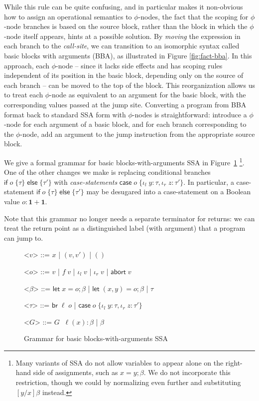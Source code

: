\documentclass[acmsmall,screen,review]{acmart}
\newcommand{\mb}[1]{\ensuremath{\mathbf{#1}}}
\newcommand{\ms}[1]{\ensuremath{\mathsf{#1}}}
\newcommand{\lto}{:}
\newcommand{\linl}[1]{\iota_l\;{#1}}
\newcommand{\linr}[1]{\iota_r\;{#1}}
\newcommand{\labort}[1]{\ms{abort}\;{#1}}
\newcommand{\letstmt}[3]{\ensuremath{\ms{let}\;#1 = #2; #3}}
\newcommand{\brb}[2]{\ms{br}\;#1\;#2}
\newcommand{\ite}[3]{\ms{if}\;#1\;\{#2\}\;\ms{else}\;\{#3\}}
\newcommand{\casestmt}[5]{\ms{case}\;#1\;\{\linl{#2} \lto #3, \linr{#4} \lto #5\}}
\begin{document}
While this rule can be quite confusing, and in particular makes it non-obvious how to assign an
operational semantics to $\phi$-nodes, the fact that the scoping for $\phi$-node branches is based
on the source block, rather than the block in which the $\phi$-node itself appears, hints at a
possible solution. By \emph{moving} the expression in each branch to the \emph{call-site}, we can
transition to an isomorphic syntax called basic blocks with arguments (BBA), as illustrated in
Figure \ref{fig:fact-bba}. In this approach, each $\phi$-node -- since it lacks side effects and has
scoping rules independent of its position in the basic block, depending only on the source of each
branch -- can be moved to the top of the block. This reorganization allows us to treat each
$\phi$-node as equivalent to an argument for the basic block, with the corresponding values passed
at the jump site. Converting a program from BBA format back to standard SSA form with $\phi$-nodes
is straightforward: introduce a $\phi$-node for each argument of a basic block, and for each branch
corresponding to the $\phi$-node, add an argument to the jump instruction from the appropriate
source block. 

We give a formal grammar for basic blocks-with-arguments SSA in Figure~\ref{fig:bba-grammar}
\footnote{ Many variants of SSA do not allow variables to appear alone on the right-hand side of
assignments, such as $x = y; \beta$.  We do not incorporate this restriction, though we could by
normalizing even further and substituting $[y/x]\beta$ instead. }. One of the other changes we make
is replacing conditional branches $\ite{o}{\tau}{\tau'}$ with \emph{case-statements}
$\casestmt{o}{y}{\tau}{z}{\tau'}$. In particular, a case-statement $\ite{o}{\tau}{\tau'}$ may be
desugared into a case-statement on a Boolean value $o : \mb{1} + \mb{1}$.

Note that this grammar no longer needs a separate terminator for returns: we can treat the return
point as a distinguished label (with argument) that a program can jump to. 

\begin{figure}[H]
  \begin{center}
    \begin{grammar}
      <\(v\)> ::= \(x\) \;|\; \((v, v')\) \;|\; \(()\)

      <\(o\)> ::= \(v\) \;|\; \(f\;v\) \;|\; \(\linl{v}\) \;|\; \(\linr{v}\) \;|\; \(\labort{v}\)

      <\(\beta\)> ::= 
      \(\letstmt{x}{o}{\beta}\)
      \;|\; \(\letstmt{(x, y)}{o}{\beta}\)
      \;|\; \(\tau\)

      <\(\tau\)> ::= \(\brb{\ell}{o}\) \;|\; $\casestmt{o}{y}{\tau}{z}{\tau'}$
      
      <\(G\)> ::= \(G \;\; \ell(x) : \beta\) \;|\; \(\beta\)
    \end{grammar}
  \end{center}
  \caption{Grammar for basic blocks-with-arguments SSA} 
  \Description{}
  \label{fig:bba-grammar}
\end{figure}
\end{document}
